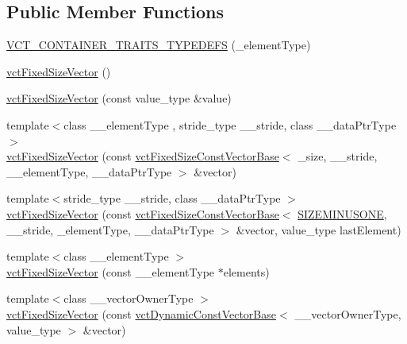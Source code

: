 \subsection*{Public Member Functions}
\begin{DoxyCompactItemize}
\item 
\hyperlink{classvct_fixed_size_vector_a418a683fb9eb410416a48ef6c21cd34f}{V\+C\+T\+\_\+\+C\+O\+N\+T\+A\+I\+N\+E\+R\+\_\+\+T\+R\+A\+I\+T\+S\+\_\+\+T\+Y\+P\+E\+D\+E\+F\+S} (\+\_\+element\+Type)
\item 
\hyperlink{classvct_fixed_size_vector_a77fbc89a1103f7a2ece1b66cc7fa59cf}{vct\+Fixed\+Size\+Vector} ()
\item 
\hyperlink{classvct_fixed_size_vector_a9ccee474c1ccae6fb6c03659948e26c0}{vct\+Fixed\+Size\+Vector} (const value\+\_\+type \&value)
\item 
{\footnotesize template$<$class \+\_\+\+\_\+element\+Type , stride\+\_\+type \+\_\+\+\_\+stride, class \+\_\+\+\_\+data\+Ptr\+Type $>$ }\\\hyperlink{classvct_fixed_size_vector_a2a06cdd6e30d5abca3391139cdb1846a}{vct\+Fixed\+Size\+Vector} (const \hyperlink{classvct_fixed_size_const_vector_base}{vct\+Fixed\+Size\+Const\+Vector\+Base}$<$ \+\_\+size, \+\_\+\+\_\+stride, \+\_\+\+\_\+element\+Type, \+\_\+\+\_\+data\+Ptr\+Type $>$ \&vector)
\item 
{\footnotesize template$<$stride\+\_\+type \+\_\+\+\_\+stride, class \+\_\+\+\_\+data\+Ptr\+Type $>$ }\\\hyperlink{classvct_fixed_size_vector_a11370c6a730334a10d140992d207c057}{vct\+Fixed\+Size\+Vector} (const \hyperlink{classvct_fixed_size_const_vector_base}{vct\+Fixed\+Size\+Const\+Vector\+Base}$<$ \hyperlink{group__cisst_vector_ggae684c096a8e0682238147d0cbc182cdeaa60fa332debc82a5c232c3330c14f4fd}{S\+I\+Z\+E\+M\+I\+N\+U\+S\+O\+N\+E}, \+\_\+\+\_\+stride, \+\_\+element\+Type, \+\_\+\+\_\+data\+Ptr\+Type $>$ \&vector, value\+\_\+type last\+Element)
\item 
{\footnotesize template$<$class \+\_\+\+\_\+element\+Type $>$ }\\\hyperlink{classvct_fixed_size_vector_a33324f9254a1b465cf66aeca6c4cb18b}{vct\+Fixed\+Size\+Vector} (const \+\_\+\+\_\+element\+Type $\ast$elements)
\item 
{\footnotesize template$<$class \+\_\+\+\_\+vector\+Owner\+Type $>$ }\\\hyperlink{classvct_fixed_size_vector_ac4ea45620ddcaa7df30f806e8a3ba26f}{vct\+Fixed\+Size\+Vector} (const \hyperlink{classvct_dynamic_const_vector_base}{vct\+Dynamic\+Const\+Vector\+Base}$<$ \+\_\+\+\_\+vector\+Owner\+Type, value\+\_\+type $>$ \&vector)

\end{DoxyCompactItemize}
